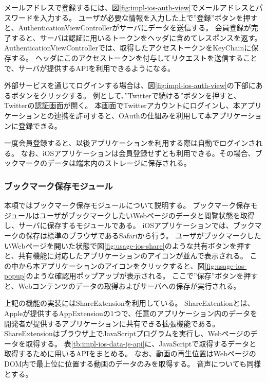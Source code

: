 メールアドレスで登録するには、図\ref{fig:impl-ios-auth-view}でメールアドレスとパスワードを入力する。
ユーザが必要な情報を入力した上で”登録”ボタンを押すと、AuthenticationViewControllerがサーバにデータを送信する。
会員登録が完了すると、サーバは認証に用いるトークンをヘッダに含めてレスポンスを返す。
AuthenticationViewControllerでは、取得したアクセストークンをKeyChain\cite{keychain}に保存する。
ヘッダにこのアクセストークンを付与してリクエストを送信することで、サーバが提供するAPIを利用できるようになる。

外部サービスを通じてログインする場合は、図\ref{fig:impl-ios-auth-view}の下部にあるボタンをクリックする。
例として、”Twitterで続ける”ボタンを押すと、Twitter\cite{twitter}の認証画面が開く。
本画面でTwitterアカウントにログインし、本アプリケーションとの連携を許可すると、OAuthの仕組みを利用して本アプリケーションに登録できる。

一度会員登録すると、以後アプリケーションを利用する際は自動でログインされる。
なお、iOSアプリケーションは会員登録せずとも利用できる。その場合、ブックマークのデータは端末内のストレージに保存される。

\subsubsection{ブックマーク保存モジュール}
本項ではブックマーク保存モジュールについて説明する。
ブックマーク保存モジュールはユーザがブックマークしたいWebページのデータと閲覧状態を取得し、サーバに保存するモジュールである。
iOSアプリケーションでは、ブックマークの保存は標準のブラウザであるSafariから行う。
ユーザがブックマークしたいWebページを開いた状態で図\ref{fig:usage-ios-share}のような共有ボタンを押すと、共有機能に対応したアプリケーションのアイコンが並んで表示される。
この中から本アプリケーションのアイコンをクリックすると、図\ref{fig:usage-ios-popup}のような確認用ポップアップが表示される。
ここで”保存”ボタンを押すと、Webコンテンツのデータの取得およびサーバへの保存が実行される。

上記の機能の実装にはShareExtension\cite{share-extension}を利用している。
ShareExtentionとは、Appleが提供するAppExtension\cite{app-extension}の1つで、任意のアプリケーション内のデータを開発者が提供するアプリケーションに共有できる拡張機能である。
ShareExtensionはブラウザ上でJavaScriptプログラムを実行し、Webページのデータを取得する。
表\ref{tb:impl-ios-data-js-api}に、JavaScriptで取得するデータと取得するために用いるAPIをまとめる。
なお、動画の再生位置はWebページのDOM内で最上位に位置する動画のデータのみを取得する。
音声についても同様とする。

